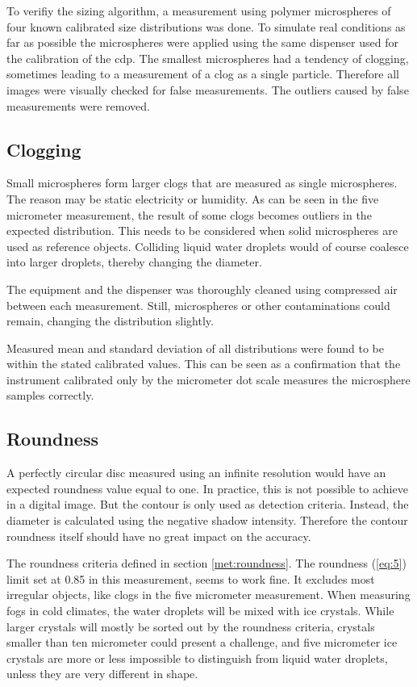 To verifiy the sizing algorithm, a measurement using polymer microspheres of four known calibrated size distributions was done. To simulate real conditions as far as possible the microspheres were applied using the same dispenser used for the calibration of the \gls{cdp}. The smallest microspheres had a tendency of clogging, sometimes leading to a measurement of a clog as a single particle. Therefore all images were visually checked for false measurements. The outliers caused by false measurements were removed.

\subsection{Clogging}

Small microspheres form larger clogs that are measured as single microspheres. The reason may be static electricity or humidity. As can be seen in the five micrometer measurement, the result of some clogs becomes outliers in the expected distribution. This needs to be considered when solid microspheres are used as reference objects. Colliding liquid water droplets would of course coalesce into larger droplets, thereby changing the diameter.

The equipment and the dispenser was thoroughly cleaned using compressed air between each measurement. Still, microspheres or other contaminations could remain, changing the distribution slightly.

Measured mean and standard deviation of all distributions were found to be within the stated calibrated values. This can be seen as a confirmation that the instrument calibrated only by the micrometer dot scale measures the microsphere samples correctly.

\subsection{Roundness}

A perfectly circular disc measured using an infinite resolution would have an expected roundness value equal to one. In practice, this is not possible to achieve in a digital image. But the contour is only used as detection criteria. Instead, the diameter is calculated using the negative shadow intensity. Therefore the contour roundness itself should have no great impact on the accuracy.

The roundness criteria defined in section \ref{met:roundness}. The roundness (\ref{eq:5}) limit set at 0.85 in this measurement, seems to work fine. It excludes most irregular objects, like clogs in the five micrometer measurement. When measuring fogs in cold climates, the water droplets will be mixed with ice crystals. While larger crystals will mostly be sorted out by the roundness criteria, crystals smaller than ten micrometer could present a challenge, and five micrometer ice crystals are more or less impossible to distinguish from liquid water droplets, unless they are very different in shape.

